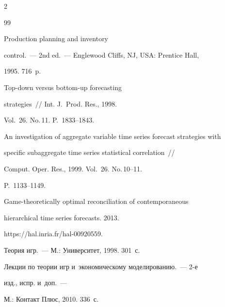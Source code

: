 \begin{multicols}{2}
{{\begin{thebibliography}{99}

 Production planning and inventory

    control.~--- 2nd ed.~--- Englewood Cliffs, NJ, USA: Prentice Hall,

    1995. 716~p.




 Top-down versus bottom-up forecasting

    strategies~// Int. J.~Prod. Res., 1998.

    Vol.~26. No.\,11. P.~1833--1843.




 An investigation of aggregate variable time series forecast strategies with

    specific subaggregate time series statistical correlation~//

    Comput. Oper. Res., 1999. Vol.~26. No.\,10--11.

    P.~1133--1149.




  Game-theoretically optimal reconciliation of contemporaneous

    hierarchical time series forecasts. 2013.

    {\sf https://hal.inria.fr/hal-00920559}.









Теория игр.~--- М.: Университет, 1998. 301~с.




 Лекции по теории игр и~экономическому моделированию.~--- 2-е

    изд., испр. и~доп.~---

    М.: Контакт Плюс, 2010. 336~с.





\end{thebibliography}}}
\end{multicols}
